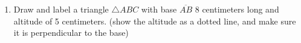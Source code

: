 \begin{enumerate}
\item Draw and label a triangle $\triangle ABC$ with base $\overline{AB}$ 8 centimeters long and altitude of 5 centimeters. (show the altitude as a dotted line, and make sure it is perpendicular to the base) 
  
\end{enumerate}
